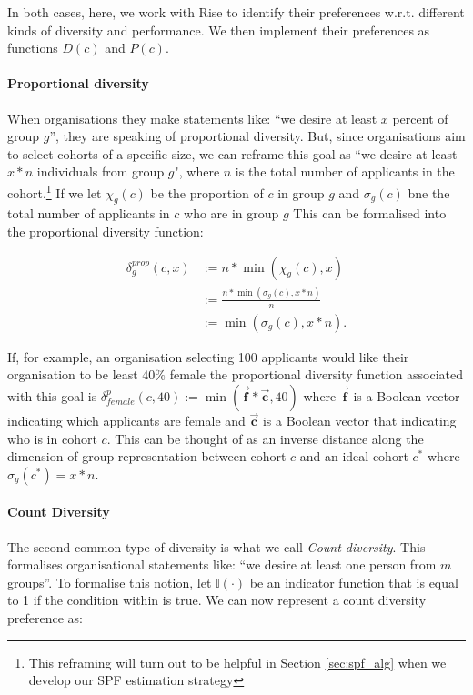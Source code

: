In both cases, here, we work with Rise to identify their preferences w.r.t. different kinds of diversity and performance. We then implement their preferences as functions $D(c)$ and $P(c)$.

\paragraph{Proportional diversity} When organisations they make statements like: ``we desire at least $x$ percent of group $g$'', they are speaking of proportional diversity. But, since organisations aim to select cohorts of a specific size, we can reframe this goal as ``we desire at least $x*n$ individuals from group $g$", where $n$ is the total number of applicants in the cohort.\footnote{This reframing will turn out to be helpful in Section \ref{sec:spf_alg} when we develop our SPF estimation strategy} If we let $\chi_g(c)$ be the proportion of $c$ in group $g$ and $\sigma_g(c)$ bne the total number of applicants in $c$ who are in group $g$ This can be formalised into the proportional diversity function:

\begin{equation}
    \begin{split}
        \delta_{g}^{prop}(c,x) &:= n*\min(\chi_g(c), x) \\
        & := \frac{n* \min(\sigma_g(c), x*n)}{n} \\ 
        & := \min(\sigma_g(c), x*n). \label{eq:prop_div_function}
    \end{split}
\end{equation}

If, for example, an organisation selecting 100 applicants would like their organisation to be least $40\%$ female the proportional diversity function associated with this goal is $\delta_{female}^p(c, 40) := \min(\vec{\mathbf{f}}*\vec{\mathbf{c}}, 40)$ where $\vec{\mathbf{f}}$ is a Boolean vector indicating which applicants are female and $\vec{\mathbf{c}}$ is a Boolean vector that indicating who is in cohort $c$. This can be thought of as an inverse distance along the dimension of group representation between cohort $c$ and an ideal cohort $c^*$ where $\sigma_g(c^*) = x*n$.

\paragraph{Count Diversity} The second common type of diversity is what we call \emph{Count diversity}. This formalises organisational statements like: ``we desire at least one person from $m$ groups''. To formalise this notion, let $\mathbb{I}(\cdot)$ be an indicator function that is equal to 1 if the condition within is true. We can now represent a count diversity preference as:

